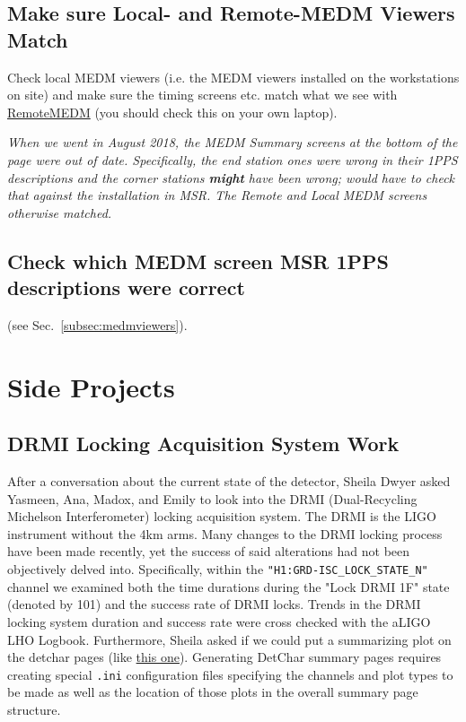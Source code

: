 \documentclass{article}
\newcommand*{\TODO}{\textcolor{todo}}
\begin{document}
\TODO{
\subsection{Make sure Local- and Remote-MEDM Viewers Match}
}
Check local MEDM viewers (i.e. the MEDM viewers installed on the workstations on site) and make sure the timing screens etc. match what we see with \href{https://wiki.ligo.org/RemoteAccess/RemoteEPICS}{RemoteMEDM} (you should check this on your own laptop).

\textit{When we went in August 2018, the MEDM Summary screens at the bottom of the page were out of date. Specifically, the end station ones were wrong in their 1PPS descriptions and the corner stations \textbf{might} have been wrong; would have to check that against the installation in MSR. The Remote and Local MEDM screens otherwise matched.}

\TODO{
\subsection{\label{subsec:medmviewers} Check which MEDM screen MSR 1PPS descriptions were correct}
}
(see Sec.~\ref{subsec:medmviewers}).

\section{Side Projects}

\TODO{\subsection{DRMI Locking Acquisition System Work}}

After a conversation about the current state of the detector, Sheila Dwyer asked Yasmeen, Ana, Madox, and Emily to look into the DRMI (Dual-Recycling Michelson Interferometer) locking acquisition system. The DRMI is the LIGO instrument without the 4km arms. Many changes to the DRMI locking process have been made recently, yet the success of said alterations had not been objectively delved into. Specifically, within the \texttt{"H1:GRD-ISC\_LOCK\_STATE\_N"} channel we examined both the time durations during the "Lock DRMI 1F" state (denoted by 101) and the success rate of DRMI locks. Trends in the DRMI locking system duration and success rate were cross checked with the aLIGO LHO Logbook. Furthermore, Sheila asked if we could put a summarizing plot on the detchar pages (like \href{https://ldas-jobs.ligo.caltech.edu/~detchar/summary/day/20190111/psl/}{this one}). Generating DetChar summary pages requires creating special \texttt{.ini} configuration files specifying the channels and plot types to be made as well as the location of those plots in the overall summary page structure.
\end{document}
